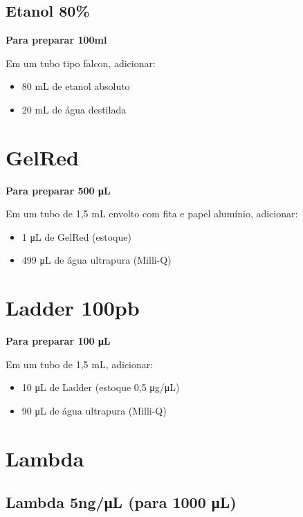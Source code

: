 \documentclass[
  letterpaper,
  DIV=11,
  numbers=noendperiod]{scrreprt}
\begin{document}
\hypertarget{etanol-80}{%
\subsection{Etanol 80\%}\label{etanol-80}}

\textbf{Para preparar 100ml}

Em um tubo tipo falcon, adicionar:

\begin{itemize}
\item
  80 mL de etanol absoluto
\item
  20 mL de água destilada
\end{itemize}

\hypertarget{gelred}{%
\section{GelRed}\label{gelred}}

\textbf{Para preparar 500 μL}

Em um tubo de 1,5 mL envolto com fita e papel alumínio, adicionar:

\begin{itemize}
\item
  1 μL de GelRed (estoque)
\item
  499 μL de água ultrapura (Milli-Q)
\end{itemize}

\hypertarget{ladder-100pb}{%
\section{Ladder 100pb}\label{ladder-100pb}}

\textbf{Para preparar 100 μL}

Em um tubo de 1,5 mL, adicionar:

\begin{itemize}
\item
  10 μL de Ladder (estoque 0,5 μg/μL)
\item
  90 μL de água ultrapura (Milli-Q)
\end{itemize}

\hypertarget{lambda}{%
\section{Lambda}\label{lambda}}

\hypertarget{lambda-5ngux3bcl-para-1000-ux3bcl}{%
\subsection{Lambda 5ng/μL (para 1000
μL)}\label{lambda-5ngux3bcl-para-1000-ux3bcl}}
\end{document}
